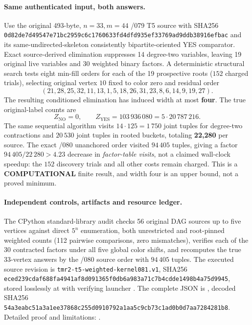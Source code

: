 \documentclass[11pt]{article}
\begin{document}
\paragraph{Same authenticated input, both answers.}
Use the original 493-byte, $n=33,m=44$ /079 T5 source with
SHA256 \texttt{0d82de7d49547e71bc2959c6c1760633fd4dfd935ef33769ad9ddb38916efbac}
and its same-undirected-skeleton consistently bipartite-oriented
YES comparator.  Exact source-derived elimination suppresses 14
degree-two variables, leaving 19 original live variables and 30
weighted binary factors.  A deterministic structural search tests
eight min-fill orders for each of the 19 prospective roots
($152$ charged trials), selecting original vertex $10$ fixed
to color zero and residual order
\[
(21,28,25,32,11,13,1,5,18,26,31,23,8,6,14,9,19,27).
\]
The resulting conditioned elimination has induced width at
most \textbf{four}.  The true original-label counts are
\[
Z_{\mathrm{NO}}=0,\qquad
Z_{\mathrm{YES}}=103\,936\,080
=5\cdot20\,787\,216.
\]
The same sequential algorithm visits $14\cdot125=1\,750$
joint tuples for degree-two contractions and $20\,530$
joint tuples in rooted buckets, totaling \textbf{22,280}
per source.  The exact /080 unanchored order visited
$94\,405$ tuples, giving a factor $94\,405/22\,280>4.23$
decrease in \emph{factor-table visits}, not a claimed
wall-clock speedup: the $152$ discovery trials and all
other costs remain charged.  This is a
\textbf{COMPUTATIONAL} finite result, and width four is
an upper bound, not a proved minimum.

\paragraph{Independent controls, artifacts and resource ledger.}
The CPython standard-library audit checks 56 original DAG
sources up to five vertices against direct $5^n$ enumeration,
both unrestricted and root-pinned weighted counts (112
pairwise comparisons, zero mismatches), verifies each of the
30 contracted factors under all five global color shifts,
and recomputes the true 33-vertex answers by the /080
source order with $94\,405$ tuples.  The executed source
revision is \texttt{tmr2-t5-weighted-kernel081.v1},
SHA256 \texttt{eced239cdaf688fa4941af8d091365f0db6a983a71c7b4cdde1498b4a75d9945},
stored losslessly at
with verifying launcher
.
The complete JSON is
,
decoded SHA256
\texttt{54a3eabc51a3a1ee37868c255d0910792a1aa5c9cb73c1ad0b0d7aa7284281b8}.
Detailed proof and limitations:
.
\end{document}
